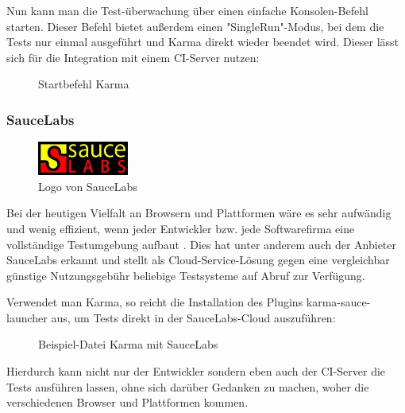 Nun kann man die Test-überwachung über einen einfache Konsolen-Befehl starten. Dieser Befehl bietet außerdem einen "SingleRun"-Modus, bei dem die Tests nur einmal ausgeführt und Karma direkt wieder beendet wird. Dieser lässt sich für die Integration mit einem CI-Server nutzen:

\begin{figure}[H]
	\begin{center}
		\caption{Startbefehl Karma}
		\label{bash:karma}
	\end{center}
\end{figure}

\subsubsection{SauceLabs}

\begin{figure}[H]
	\begin{center}
		\includegraphics[width=3cm]{bilder/saucelabs}
		\caption{Logo von SauceLabs}
		\label{image:saucelabs}
	\end{center}
\end{figure}

Bei der heutigen Vielfalt an Browsern und Plattformen wäre es sehr aufwändig und wenig effizient, wenn jeder Entwickler bzw. jede Softwarefirma eine vollständige Testumgebung aufbaut \citep[Vgl.][]{Nguyen13}. Dies hat unter anderem auch der Anbieter SauceLabs erkannt und stellt als Cloud-Service-Lösung gegen eine vergleichbar günstige Nutzungsgebühr beliebige Testsysteme auf Abruf zur Verfügung.

Verwendet man Karma, so reicht die Installation des Plugins karma-sauce-launcher aus, um Tests direkt in der SauceLabs-Cloud auszuführen:

\begin{figure}[H]
	\begin{center}
		\caption{Beispiel-Datei Karma mit SauceLabs}
		\label{code:saucelabs}
	\end{center}
\end{figure}

Hierdurch kann nicht nur der Entwickler sondern eben auch der \ac{CI}-Server die Tests ausführen lassen, ohne sich darüber Gedanken zu machen, woher die verschiedenen Browser und Plattformen kommen.
